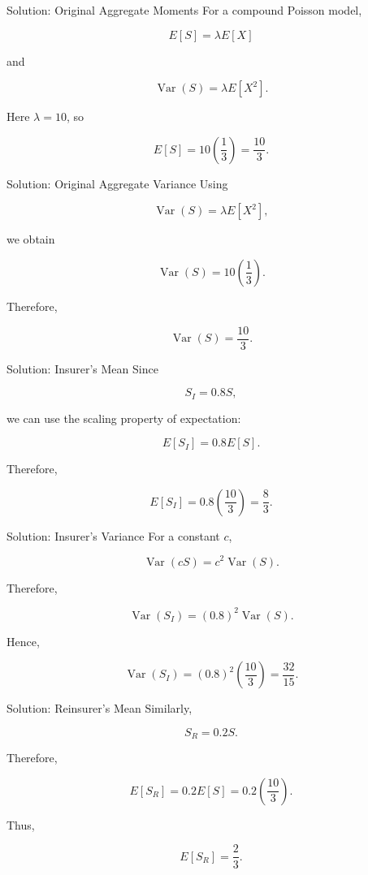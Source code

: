 \documentclass[
  ignorenonframetext,
  aspectratio=169,
]{beamer}
\begin{document}
\begin{frame}{Solution: Original Aggregate Moments}
\protect{}\label{solution-original-aggregate-moments}
For a compound Poisson model,

\[
E[S]=\lambda E[X]
\]

and

\[
\operatorname{Var}(S)=\lambda E[X^2].
\]

Here \(\lambda=10\), so

\[
E[S]
=
10\left(\frac{1}{3}\right)
=
\boxed{\frac{10}{3}}.
\]
\end{frame}

\begin{frame}{Solution: Original Aggregate Variance}
\protect{}\label{solution-original-aggregate-variance}
Using

\[
\operatorname{Var}(S)=\lambda E[X^2],
\]

we obtain

\[
\operatorname{Var}(S)
=
10\left(\frac{1}{3}\right).
\]

Therefore,

\[
\boxed{\operatorname{Var}(S)=\frac{10}{3}}.
\]
\end{frame}

\begin{frame}{Solution: Insurer's Mean}
\protect{}\label{solution-insurers-mean}
Since

\[
S_I=0.8S,
\]

we can use the scaling property of expectation:

\[
E[S_I]
=
0.8E[S].
\]

Therefore,

\[
E[S_I]
=
0.8\left(\frac{10}{3}\right)
=
\boxed{\frac{8}{3}}.
\]
\end{frame}

\begin{frame}{Solution: Insurer's Variance}
\protect{}\label{solution-insurers-variance}
For a constant \(c\),

\[
\operatorname{Var}(cS)=c^2\operatorname{Var}(S).
\]

Therefore,

\[
\operatorname{Var}(S_I)
=
(0.8)^2\operatorname{Var}(S).
\]

Hence,

\[
\operatorname{Var}(S_I)
=
(0.8)^2\left(\frac{10}{3}\right)
=
\boxed{\frac{32}{15}}.
\]
\end{frame}

\begin{frame}{Solution: Reinsurer's Mean}
\protect{}\label{solution-reinsurers-mean}
Similarly,

\[
S_R=0.2S.
\]

Therefore,

\[
E[S_R]
=
0.2E[S]
=
0.2\left(\frac{10}{3}\right).
\]

Thus,

\[
\boxed{E[S_R]=\frac{2}{3}}.
\]
\end{frame}
\end{document}

